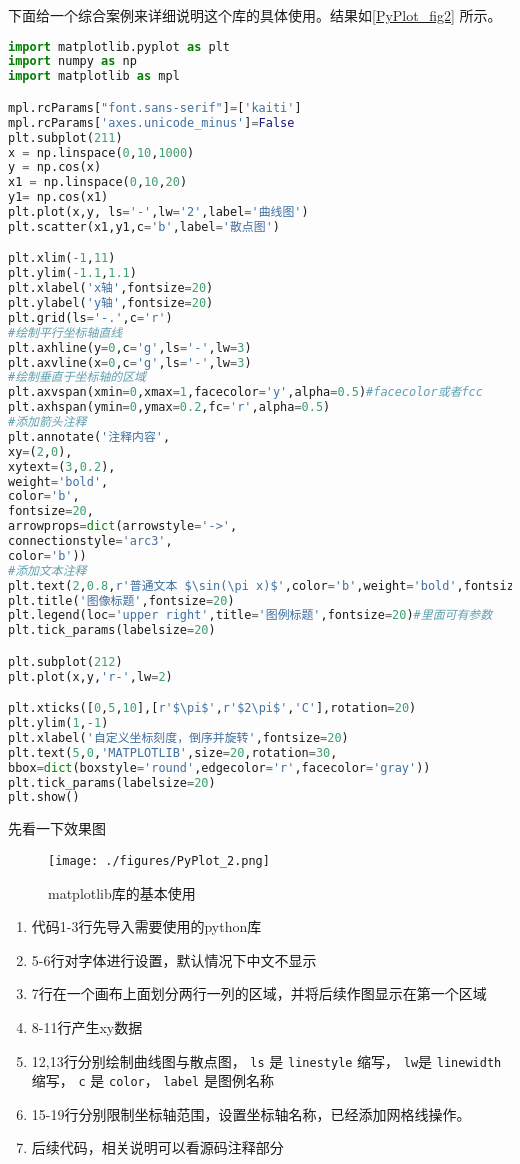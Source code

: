 下面给一个综合案例来详细说明这个库的具体使用。结果如\autoref{PyPlot_fig2} 所示。
\begin{lstlisting}[language=python]
import matplotlib.pyplot as plt
import numpy as np
import matplotlib as mpl

mpl.rcParams["font.sans-serif"]=['kaiti']
mpl.rcParams['axes.unicode_minus']=False
plt.subplot(211)
x = np.linspace(0,10,1000)
y = np.cos(x)
x1 = np.linspace(0,10,20)
y1= np.cos(x1)
plt.plot(x,y, ls='-',lw='2',label='曲线图')
plt.scatter(x1,y1,c='b',label='散点图')

plt.xlim(-1,11)
plt.ylim(-1.1,1.1)
plt.xlabel('x轴',fontsize=20)
plt.ylabel('y轴',fontsize=20)
plt.grid(ls='-.',c='r')
#绘制平行坐标轴直线
plt.axhline(y=0,c='g',ls='-',lw=3)
plt.axvline(x=0,c='g',ls='-',lw=3)
#绘制垂直于坐标轴的区域
plt.axvspan(xmin=0,xmax=1,facecolor='y',alpha=0.5)#facecolor或者fcc
plt.axhspan(ymin=0,ymax=0.2,fc='r',alpha=0.5)
#添加箭头注释
plt.annotate('注释内容',
xy=(2,0),
xytext=(3,0.2),
weight='bold',
color='b',
fontsize=20,
arrowprops=dict(arrowstyle='->',
connectionstyle='arc3',
color='b'))
#添加文本注释
plt.text(2,0.8,r'普通文本 $\sin(\pi x)$',color='b',weight='bold',fontsize=20)
plt.title('图像标题',fontsize=20)
plt.legend(loc='upper right',title='图例标题',fontsize=20)#里面可有参数
plt.tick_params(labelsize=20)

plt.subplot(212)
plt.plot(x,y,'r-',lw=2)

plt.xticks([0,5,10],[r'$\pi$',r'$2\pi$','C'],rotation=20)
plt.ylim(1,-1)
plt.xlabel('自定义坐标刻度，倒序并旋转',fontsize=20)
plt.text(5,0,'MATPLOTLIB',size=20,rotation=30,
bbox=dict(boxstyle='round',edgecolor='r',facecolor='gray'))
plt.tick_params(labelsize=20)
plt.show()
\end{lstlisting}
先看一下效果图

\begin{figure}[ht]
\centering
\texttt{[image: ./figures/PyPlot\_2.png]}
\caption{matplotlib库的基本使用} \label{PyPlot_fig2}
\end{figure}

\begin{enumerate}
\item 代码1-3行先导入需要使用的python库
\item 5-6行对字体进行设置，默认情况下中文不显示
\item 7行在一个画布上面划分两行一列的区域，并将后续作图显示在第一个区域
\item 8-11行产生xy数据
\item 12,13行分别绘制曲线图与散点图， \verb|ls| 是 \verb|linestyle| 缩写， \verb|lw|是 \verb|linewidth| 缩写， \verb|c| 是 \verb|color|， \verb|label| 是图例名称
\item 15-19行分别限制坐标轴范围，设置坐标轴名称，已经添加网格线操作。
\item 后续代码，相关说明可以看源码注释部分
\end{enumerate}

